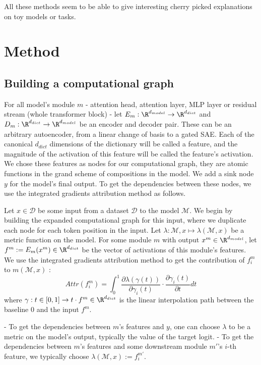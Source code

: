 \documentclass{article}
\begin{document}
All these methods seem to be able to give interesting cherry picked explanations on toy models or tasks.

\section{Method}

\subsection{Building a computational graph}

For all model's module $m$ - attention head, attention layer, MLP layer or residual stream (whole transformer block) - let $E_m : \R^{d_{model}} \rightarrow \R^{d_{dict}}$ and $D_m : \R^{d_{dict}} \rightarrow \R^{d_{model}}$ be an encoder and decoder pair. These can be an arbitrary autoencoder, from a linear change of basis to a gated SAE. Each of the canonical $d_{dict}$ dimensions of the dictionary will be called a feature, and the magnitude of the activation of this feature will be called the feature's activation. We chose these features as nodes for our computational graph, they are atomic functions in the grand scheme of compositions in the model. %
We add a sink node $y$ for the model's final output. To get the dependencies between these nodes, we use the integrated gradients attribution method as follows.

Let $x \in \mathcal{D}$ be some input from a dataset $\mathcal{D}$ to the model $\mathcal{M}$. We begin by building the expanded computational graph for this input, where we duplicate each node for each token position in the input. Let $\lambda : \mathcal{M}, x \mapsto \lambda(\mathcal{M}, x)$ be a metric function on the model. For some module $m$ with output $x^m \in \R^{d_{model}}$, let $f^m := E_m(x^m) \in \R^{d_{dict}}$ be the vector of activations of this module's features. We use the integrated gradients attribution method to get the contribution of $f^m_i$ to $m(\mathcal{M}, x)$ :
$$ Attr(f^m_i) = \int_{0}^{1} \frac{\partial \lambda(\gamma(t))}{\partial \gamma_i(t)} \cdot \frac{\partial \gamma_i(t)}{\partial t} dt $$
where $\gamma : t \in [0, 1] \rightarrow t \cdot f^m \in \R^{d_{dict}}$ is the linear interpolation path between the baseline $0$ and the input $f^m$.

- To get the dependencies between $m$'s features and $y$, one can choose $\lambda$ to be a metric on the model's output, typically the value of the target logit.
- To get the dependencies between $m$'s features and some downstream module $m'$'s $i$-th feature, we typically choose $\lambda(\mathcal{M}, x) := f^{m'}_i$.
\end{document}

